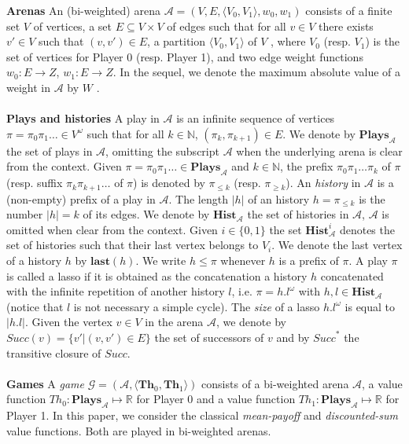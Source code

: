 \textbf{Arenas} An (bi-weighted) arena $\mathcal{A}=(V, E, \langle V_0, V_1 \rangle, w_0, w_1)$ consists of a finite set $V$ of vertices, a set $E \subseteq V \times V$ of edges such that for all $v \in V$ there exists $v' \in V$ such that $(v, v') \in E$, a partition $\langle V_0, V_1 \rangle$ of $V$ , where $V_0$ (resp. $V_1$) is the set of vertices for Player 0 (resp. Player 1), and two edge weight functions $w_0 : E \rightarrow Z$, $w_1 : E \rightarrow Z$. In the sequel, we denote the maximum absolute value of a weight in $\mathcal{A}$ by $W$ .
\\
\\
\noindent\textbf{Plays and histories} A play in $\mathcal{A}$ is an infinite sequence of vertices $ \pi = \pi_0\pi_1 \dots \in V^{\omega}$ such that for all $k \in \mathbb{N}$, $(\pi_k, \pi_{k+1}) \in E$. We denote by $\mathbf{Plays}_{\mathcal{A}}$ the set of plays in $\mathcal{A}$, omitting the subscript $\mathcal{A}$ when the underlying arena is clear from the context. Given $ \pi = \pi_0\pi_1\dots \in \mathbf{Plays}_{\mathcal{A}}$ and $k \in \mathbb{N}$, the prefix $\pi_0\pi_1\dots\pi_k$ of $\pi$ (resp. suffix $\pi_k\pi_{k+1}\dots$ of $\pi$) is denoted by $\pi_{\leqslant k}$ (resp. $\pi_{\geq k}$). An \textit{history} in $\mathcal{A}$ is a (non-empty) prefix of a play in $\mathcal{A}$. The length $|h|$ of an history $h=\pi_{\leqslant k}$ is the number $|h|=k$ of its edges. We denote by $\mathbf{Hist}_{\mathcal{A}}$ the set of histories in $\mathcal{A}$, $\mathcal{A}$ is omitted when clear from the context. Given $i \in \{0,1\}$ the set $\mathbf{Hist}^i_{\mathcal{A}}$ denotes the set of histories such that their last vertex belongs to $V_i$. We denote the last vertex of a history $h$ by $\mathbf{last}(h)$. We write $h\leqslant\pi$ whenever $h$ is a prefix of $\pi$. A play $\pi$ is called a lasso if it is obtained as the concatenation a history $h$ concatenated with the infinite repetition of another history $l$, i.e. $\pi = h.l^{\omega}$ with $h, l \in \mathbf{Hist}_{\mathcal{A}}$ (notice that $l$ is not necessary a simple cycle). The \textit{size} of a lasso $h.l^{\omega}$ is equal to $|h.l|$. Given the vertex $v \in V$ in the arena $\mathcal{A}$, we denote by $\textit{Succ}(v) = \{v' | (v,v') \in E \}$ the set of successors of $v$ and by $\textit{Succ}^*$ the transitive closure of $\textit{Succ}$.
\\
\\
\noindent\textbf{Games} A \textit{game} $\mathcal{G} = (\mathcal{A},\langle \mathbf{Th}_0, \mathbf{Th}_1\rangle)$ consists of a bi-weighted arena $\mathcal{A}$, a value function $Th_0 : \mathbf{Plays}_{\mathcal{A}} \mapsto \mathbb{R}$ for Player 0 and a value function $Th_1 : \mathbf{Plays}_{\mathcal{A}} \mapsto \mathbb{R}$ for Player 1. In this paper, we consider the classical \textit{mean-payoff} and \textit{discounted-sum} value functions. Both are played in bi-weighted arenas.

